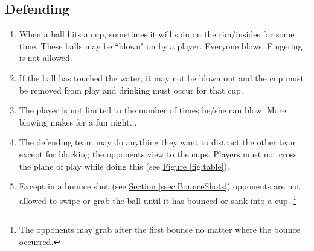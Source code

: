     \subsection{Defending}\label{ssec:Defending}
		\begin{enumerate}[label=(\roman*), ref=\roman*]
            \item \label{sssec:Defending,blowing} When a ball hits a cup, sometimes it will spin on the rim/insides for some time.
                These balls may be ``blown" on by a player.
                Everyone blows.
                Fingering is not allowed. 
            \item \label{ssec:Defending,blowing_voids} If the ball has touched the water, it may not be blown out and the cup must be removed from play and drinking must occur for that cup. 
            \item \label{sssec:Defending,blowing_times} The player is not limited to the number of times he/she can blow. More blowing makes for a fun night... 
            \item \label{sssec:Defending,pysycedout} The defending team may do anything they want to distract the other team except for blocking the opponents view to the cups.
                Players must not cross the plane of play while doing this (see \hyperref[fig:table]{Figure \ref*{fig:table}}). 
            \item \label{sssec:Defending,balltouching} Except in a bounce shot (see \hyperref[ssec:BounceShots]{Section \ref*{ssec:BounceShots}}) opponents are not allowed to swipe or grab the ball until it has bounced or sank into a cup. \footnote{The opponents may grab after the first bounce no matter where the bounce occurred.}
        \end{enumerate}
